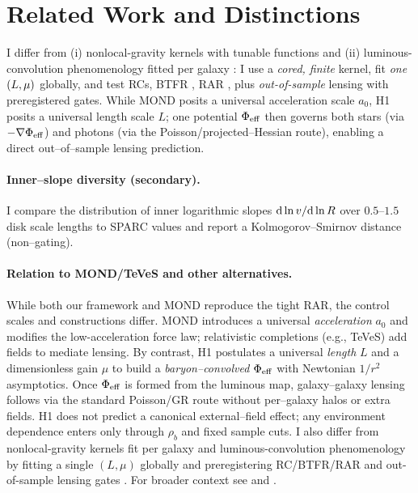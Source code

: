 		\section{Related Work and Distinctions}\label{sec:related}
		I differ from (i) nonlocal-gravity kernels with tunable functions \citep{rahvar2014_nonlocal_rotation} and (ii) luminous-convolution phenomenology fitted per galaxy \citep{cisneros2014_lcm}: I use a \emph{cored, finite} kernel, fit \emph{one} $(L,\mu)$ globally, and test RCs, BTFR \citep{lelli2016sparc}, RAR \citep{mcgaugh2016rar}, plus \emph{out-of-sample} lensing with preregistered gates.
		While MOND posits a universal acceleration scale $a_0$, H1 posits a universal length scale $L$; one potential $\Phi_{\rm eff}$ then governs both stars (via $-\nabla\Phi_{\rm eff}$) and photons (via the Poisson/projected–Hessian route), enabling a direct out–of–sample lensing prediction.
		
		\paragraph{Inner--slope diversity (secondary).}
		I compare the distribution of inner logarithmic slopes ${\rm d}\ln v/{\rm d}\ln R$ over $0.5$--$1.5$ disk scale lengths to SPARC values and report a Kolmogorov--Smirnov distance (non--gating).
		
\paragraph{Relation to MOND/TeVeS and other alternatives.}
While both our framework and MOND reproduce the tight RAR, the control scales and constructions differ.
MOND introduces a universal \emph{acceleration} $a_0$ and modifies the low-acceleration force law; relativistic completions (e.g., TeVeS) add fields to mediate lensing.
By contrast, H1 postulates a universal \emph{length} $L$ and a dimensionless gain $\mu$ to build a \emph{baryon–convolved} $\Phi_{\rm eff}$ with Newtonian $1/r^2$ asymptotics.
Once $\Phi_{\rm eff}$ is formed from the luminous map, galaxy–galaxy lensing follows via the standard Poisson/GR route without per–galaxy halos or extra fields.
H1 does not predict a canonical external–field effect; any environment dependence enters only through $\rho_b$ and fixed sample cuts.
I also differ from nonlocal-gravity kernels fit per galaxy and luminous-convolution phenomenology by fitting a single $(L,\mu)$ globally and preregistering RC/BTFR/RAR and out-of-sample lensing gates \citep{rahvar2014_nonlocal_rotation,cisneros2014_lcm,lelli2016sparc,mcgaugh2016rar}.
For broader context see \citep{famaey2012mondreview} and \citet{bekenstein2004teves}.

